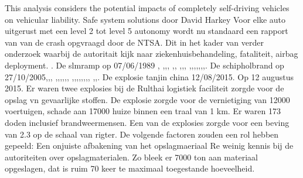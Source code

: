 This analysis considers the potential impacts of completely self-driving vehicles on vehicular liability. 
\cite{griemannExaminSelfDriving}
Safe system solutions door David Harkey
\cite{Harkey30052019SafeSystemVehicle}
Voor elke auto uitgerust met een level 2 tot level 5 autonomy wordt nu standaard een rapport van van de crash opgvraagd door de NTSA. Dit in het kader van verder onderzoek waarbij de autoritait kijk naar  ziekenhuisbehandeling, fataliteit, airbag deployment.
\cite{szymkowski29062021nhtsaTeslaCrashReports}. 
De slmramp op  07/06/1989 \cite{espnSLMterugblik},\cite{dennisRosier01052020}
\cite{hassing07062020slmramp},\cite{amsterdamArchiefSLM},\cite{rtvOost06062019nabestaande},
\cite{breda07062021AndroSnel},\cite{andereTijdenSLMCrash},
\cite{aviationReport},\cite{aviationSLMCrashAccidentInvestigation},\cite{mcDonnelDouglasCommissionReportSLMCrash},
\cite{wikiSRFlight764},\cite{nos07062019SLMTerugblik},\cite{dagvantoenSLMCrash},\cite{waterkantNesty07061989},\cite{eduNandlalSRCrash},\cite{oldjetsSRAirways},\cite{cloudberg02012021srflight764},\cite{apnews07061989srplanecrash}.
De schipholbrand op 27/10/2005\cite{schipholbrand27102005video},\cite{schipholbrand27102005video},\cite{onderzoeksraad2610schipholoost},
\cite{schipholbrandvideoargos},\cite{nunl30052023feitenoverzicht},\cite{parlementairemonitorschipholbrand},\cite{videonpoNOVA13112008},\cite{rizoomes01052014schipholbrand},\cite{heuvelkroesschipholbrandcamerabeelden},
\cite{wikiSchipholbrand},\cite{schipholbrand27102005video},\cite{onderzoeksraad2610schipholoost},\cite{schipholbrandvideoargos},\cite{nunl30052023feitenoverzicht},\cite{singeluitgeverijenSchipholbrand},\cite{eenvandaagschipholbrand},\cite{parlementairemonitorschipholbrand},
\cite{videonpoNOVA13112008},\cite{rizoomes01052014schipholbrand},\cite{heuvelkroesschipholbrandcamerabeelden}. 
De explosie tanjin china 12/08/2015. 
Op 12 augustus 2015. Er waren twee explosies bij de Rulthai logistiek  faciliteit zorgde voor de opslag vn  gevaarlijke stoffen. De explosie zorgde voor de vernietiging van 12000 voertuigen, schade aan 17000 huize binnen een traal van 1 km. Er waren 173 doden inclusief brandweermensen.
Een van de explosies zorgde voor  een beving van 2.3 op de schaal van rigter.
De volgende factoren zouden een rol hebben gepeeld:
Een onjuiste afbakening van het opslagmaeriaal
Re weinig kennis bij de autoriteiten over  opslagmaterialen. Zo bleek er 7000 ton aan materiaal opgeslagen, dat is ruim 70 keer te maximaal toegestande hoeveelheid. 

